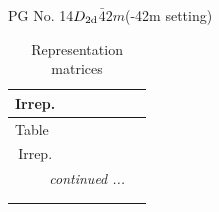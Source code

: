 \documentclass[fleqn,8pt,landscape]{jsarticle}
\begin{document}
\setcounter{MaxMatrixCols}{32}

\renewcommand{\tablename}{Table~}
\renewcommand{\figurename}{Figure~}
\begin{center}
\LARGE
PG No. 14\quad$D_{\rm 2d}$\quad$\bar{4}2m$\quad(-42m setting)\quad[ tetragonal ]
\end{center}
\renewcommand{\arraystretch}{1.2}
\begin{longtable}{ccccccc}
\caption{Representation matrices}
 \\
 \hline \hline
Irrep. &  &  &  &  &  &  \\ \hline \endfirsthead

\multicolumn{6}{l}{\tablename\ \thetable{}} \\
 \hline \hline
Irrep. &  &  &  &  &  &  \\ \hline \endhead

 \hline \hline
\multicolumn{6}{r}{\footnotesize\it continued ...} \\ \endfoot

 \hline \hline
\multicolumn{6}{r}{} \\ \endlastfoot


\end{longtable}
\end{document}
